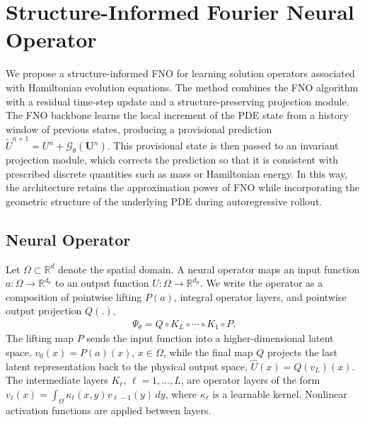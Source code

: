 \documentclass[11pt,a4paper]{article}
\theoremstyle{definition}
\theoremstyle{remark}
\numberwithin{equation}{section}
\numberwithin{figure}{section}
\numberwithin{table}{section}
\begin{document}


\section{Structure-Informed Fourier Neural Operator}
\label{sec:epfno}

We propose a structure-informed FNO for learning solution
operators associated with Hamiltonian evolution equations. The method combines
the FNO algorithm with a residual time-step update and a
structure-preserving projection module. The FNO backbone learns the local
increment of the PDE state from a history window of previous states, producing
a provisional prediction \(\widetilde U^{n+1}=U^n+\mathcal G_\theta(\mathbf U^n)\).
This provisional state is then passed to an invariant projection module, which
corrects the prediction so that it is consistent with prescribed discrete
quantities such as mass or Hamiltonian energy. In this way, the architecture
retains the approximation power of FNO while incorporating the geometric structure of the underlying PDE during autoregressive rollout.

\subsection{Neural Operator}
\label{subsec:neural_operator}

Let \(\Omega\subset\mathbb{R}^d\) denote the spatial domain. A neural operator maps an input function \(a:\Omega\to \mathbb{R}^{d_a}\) to an output function \(U:\Omega\to \mathbb{R}^{d_u}\). %
We write the operator as a composition of pointwise lifting $P(a)$, integral operator layers, and pointwise output projection $Q(.)$,
\begin{align}\label{op}
    \Psi_\theta=Q\circ K_L\circ \cdots \circ K_1\circ P.
\end{align}
The lifting map \(P\) sends the input function into a higher-dimensional latent space, \(v_0(x)=P(a)(x)\), \(x\in \Omega\), while the final map \(Q\) projects the last latent representation back to the physical output space, \(\widehat U(x)=Q(v_L)(x)\). The intermediate layers \(K_\ell\), \(\ell=1,\ldots,L\), are operator layers of the form \(v_\ell(x)=\int_\Omega \kappa_\ell(x,y)v_{\ell-1}(y)\,dy\), where \(\kappa_\ell\) is a learnable kernel. Nonlinear activation functions are
applied between layers.
\end{document}
